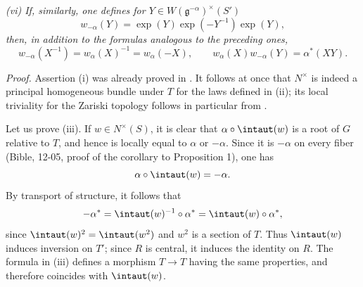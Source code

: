\smallskip
\noindent\emph{\textup{(vi)} If, similarly, one defines for
\(Y\in W(\mathfrak g^{-\alpha})^\times(S')\)}
\[
  w_{-\alpha}(Y)
    =\exp(Y)\exp(-Y^{-1})\exp(Y),
\]
\emph{then, in addition to the formulas analogous to the preceding
ones,}
\[
  w_{-\alpha}(X^{-1})
    =w_\alpha(X)^{-1}
    =w_\alpha(-X),
\qquad
  w_\alpha(X)w_{-\alpha}(Y)=\alpha^\ast(XY).
\]



\noindent\emph{Proof.}
Assertion \textup{(i)} was already proved in . It
follows at once that \(N^\times\) is indeed a principal homogeneous
bundle under \(T\) for the laws defined in \textup{(ii)}; its local
triviality for the Zariski topology follows in particular from
\textup{}.

Let us prove \textup{(iii)}. If \(w\in N^\times(S)\), it is clear
that \(\alpha\circ\intaut(w)\) is a root of \(G\) relative to \(T\),
and hence is locally equal to \(\alpha\) or \(-\alpha\). Since it is
\(-\alpha\) on every fiber \textup{(Bible, 12-05, proof of the
corollary to Proposition 1)}, one has
\[
  \alpha\circ\intaut(w)=-\alpha.
\]
By transport of structure, it follows that
\[
  -\alpha^\ast
    =\intaut(w)^{-1}\circ\alpha^\ast
    =\intaut(w)\circ\alpha^\ast,
\]
since \(\intaut(w)^2=\intaut(w^2)\) and \(w^2\) is a section of
\(T\). Thus \(\intaut(w)\) induces inversion on \(T'\); since \(R\)
is central, it induces the identity on \(R\). The formula in
\textup{(iii)} defines a morphism \(T\to T\) having the same
properties, and therefore coincides with \(\intaut(w)\).

